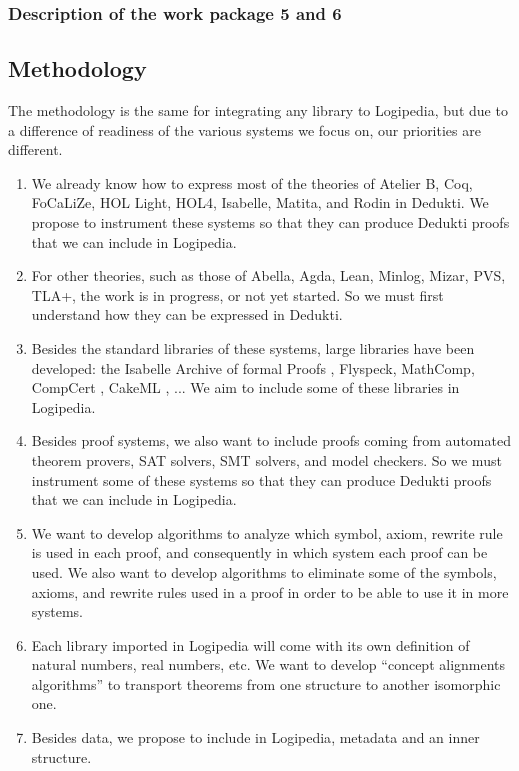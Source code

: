 \subsubsection{Description of the work package 5 and 6}

\subsection{Methodology}

The methodology is the same for integrating any library to {\textsf Logipedia},
but due to a difference of readiness of the various systems we focus on,
our priorities are different.

\begin{enumerate}
\item We already know how to express most of the theories of {\textsf Atelier B},
{\textsf Coq}, {\textsf FoCaLiZe}, {\textsf HOL Light}, {\textsf HOL4}, {\textsf
Isabelle}, {\textsf Matita}, and {\textsf Rodin} in {\textsf Dedukti}. We propose
to instrument these systems so that they can produce {\textsf Dedukti}
proofs that we can include in {\textsf Logipedia}.

\item
For other theories, such as those of {\textsf Abella}, {\textsf Agda}, {\textsf
Lean}, {\textsf Minlog}, {\textsf Mizar}, {\textsf PVS}, {\textsf TLA+}, the work is
in progress, or not yet started.  So we must first understand how they
can be expressed in {\textsf Dedukti}.

\item Besides the standard libraries of these systems, large libraries
  have been developed: the {\textsf Isabelle Archive of formal Proofs} \cite{AFP},
  {\textsf Flyspeck}\cite{Flyspeck}, {\textsf MathComp}\cite{Mathcomp}, 
  {\textsf CompCert} \cite{Compcert}, {\textsf CakeML} \cite{CakeML}, ...  We aim to include
  some of these libraries in {\textsf Logipedia}.
  
\item
Besides proof systems, we also want to include proofs coming from
automated theorem provers, SAT solvers, SMT solvers, and model
checkers.  So we must instrument some of these systems so that they
can produce {\textsf Dedukti} proofs that we can include in {\textsf
Logipedia}.

\item
We want to develop algorithms to analyze which symbol, axiom, rewrite
rule is used in each proof, and consequently in which system each proof
can be used. We also want to develop algorithms to eliminate some of the 
symbols, axioms, and rewrite rules used in a proof in order to be able to 
use it in more systems.


\item
Each library imported in {\textsf Logipedia} will come with its own
definition of natural numbers, real numbers, etc. We want to develop
``concept alignments algorithms'' to transport theorems from one
structure to another isomorphic one.

\item 
Besides data, we propose to include in {\textsf Logipedia}, metadata and
an inner structure.
\end{enumerate}



